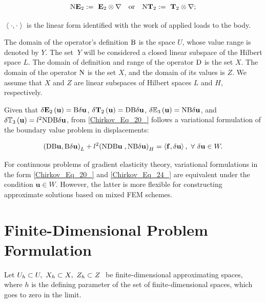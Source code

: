 \begin{equation} \label{Chirkov_Eq_23_} 
	{\rm N}{{\mathbf E}}_2:={\ {\mathbf E}}_2\otimes \nabla  \quad   {\rm or} \quad   {\rm N}{{\mathbf T}}_2:={\ {\mathbf T}}_2\otimes \nabla;
\end{equation} 

\noindent $\left\langle \cdot, \cdot \right\rangle $ is the linear form identified with the work of applied loads to the body.

The domain of the operator's definition ${\rm B}$ is the space $U$, whose value range is denoted by $Y$. The set $\ Y$ will be considered a closed linear subspace of the Hilbert space $L$. The domain of definition and range of the operator ${\rm D}$ is the set $X$. The domain of the operator ${\rm N}$ is the set $X$, and the domain of its values is $Z$. We assume that $X$ and $Z$ are linear subspaces of Hilbert spaces $L$ and $H$, respectively.

Given that $\delta {{\mathbf E}}_2\left({\mathbf u}\right)={\rm B}\delta {\mathbf u}$, $\delta {{\mathbf T}}_2\left({\mathbf u}\right)={\rm DB}\delta {\mathbf u}$\textit{, }$\delta {{\mathbb E}}_3\left({\mathbf u}\right)={\rm NB}\delta {\mathbf u}$, and $\delta {{\mathbb T}}_3\left({\mathbf u}\right)=l^2{\rm NDB}\delta {\mathbf u}$, from \eqref{Chirkov_Eq_20_} follows a variational formulation of the boundary value problem in displacements:

\begin{equation} \label{Chirkov_Eq_24_} 
	{\left({\rm DB}{\mathbf u},{\rm B}\delta {\mathbf u}\right)}_L+l^2{\left({\rm NDB}{\mathbf u}\;,{\rm NB}\delta {\mathbf u}\right)}_H=\left\langle {\mathbf f},\delta{\mathbf u}\right\rangle ,\      \forall \ \delta {\mathbf u}\in W. 
\end{equation} 

For continuous problems of gradient elasticity theory, variational formulations in the form \eqref{Chirkov_Eq_20_} and \eqref{Chirkov_Eq_24_} are equivalent under the condition ${\mathbf u}\in W$. However, the latter is more flexible for constructing approximate solutions based on mixed FEM schemes.



\section{Finite-Dimensional Problem Formulation}

Let $U_h\subset U,\ X_h\subset X,\ Z_h\subset Z{\rm \ }{\rm \ }$be finite-dimensional approximating spaces, where $h$ is the defining parameter of the set of finite-dimensional spaces, which goes to zero in the limit. 


